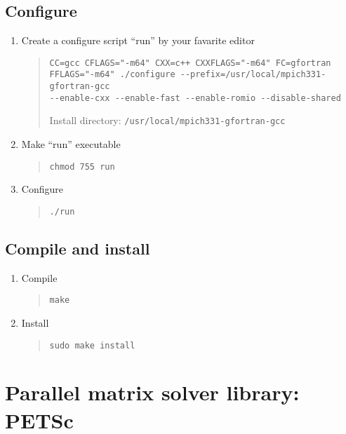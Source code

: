 \documentclass[11pt]{article}
\begin{document}
\subsection{Configure}
\begin{enumerate}
\item
Create a configure script ``run'' by your favarite editor

\begin{quote}
\begin{verbatim}
CC=gcc CFLAGS="-m64" CXX=c++ CXXFLAGS="-m64" FC=gfortran
FFLAGS="-m64" ./configure --prefix=/usr/local/mpich331-gfortran-gcc
--enable-cxx --enable-fast --enable-romio --disable-shared
\end{verbatim}
Install directory: \verb|/usr/local/mpich331-gfortran-gcc|
\end{quote}

\item
Make ``run'' executable 
\begin{quote}
\begin{verbatim}
chmod 755 run
\end{verbatim}
\end{quote}

\item
Configure
\begin{quote}
\begin{verbatim}
./run
\end{verbatim}
\end{quote}
\end{enumerate}

\subsection{Compile and install}
\begin{enumerate}
\item
Compile
\begin{quote}
\begin{verbatim}
make
\end{verbatim}
\end{quote}
\item
Install
\begin{quote}
\begin{verbatim}
sudo make install
\end{verbatim}
\end{quote}
\end{enumerate}


\section{Parallel matrix solver library: PETSc}
\end{document}
